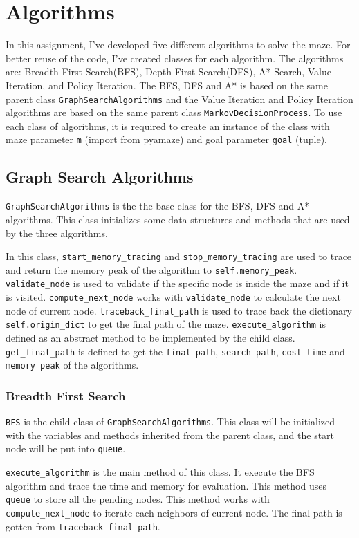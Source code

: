 \documentclass{article}
\begin{document}
\section{Algorithms}
In this assignment, I've developed five different algorithms to solve the maze. 
For better reuse of the code, I've created classes for each algorithm.
The algorithms are: Breadth First Search(BFS), Depth First Search(DFS), A* Search, Value Iteration, and Policy Iteration.
The BFS, DFS and A* is based on the same parent class \texttt{GraphSearchAlgorithms} and the Value Iteration and Policy Iteration algorithms are based on the same parent class \texttt{MarkovDecisionProcess}.
To use each class of algorithms, it is required to create an instance of the class with maze parameter \texttt{m} (import from pyamaze) and goal parameter \texttt{goal} (tuple). 
\subsection{Graph Search Algorithms}

\texttt{GraphSearchAlgorithms} is the the base class for the BFS, DFS and A* algorithms. This class initializes some data structures and methods that are used by the three algorithms. 

In this class, \texttt{start\_memory\_tracing} and \texttt{stop\_memory\_tracing} are used to trace and return the memory peak of the algorithm to \texttt{self.memory\_peak}. \texttt{validate\_node} is used to validate if the specific node is inside the maze and if it is visited.
\texttt{compute\_next\_node} works with \texttt{validate\_node} to calculate the next node of current node. \texttt{traceback\_final\_path} is used to trace back the dictionary \texttt{self.origin\_dict} to get the final path of the maze. \texttt{execute\_algorithm} is defined as an abstract method to be implemented by the child class. 
\texttt{get\_final\_path} is defined to get the \texttt{final path}, \texttt{search path}, \texttt{cost time} and \texttt{memory peak} of the algorithms. 

\subsubsection{Breadth First Search}
\texttt{BFS} is the child class of \texttt{GraphSearchAlgorithms}. 
This class will be initialized with the variables and methods inherited from the parent class, and the start node will be put into \texttt{queue}.

\texttt{execute\_algorithm} is the main method of this class. 
It execute the BFS algorithm and trace the time and memory for evaluation.
This method uses \texttt{queue} to store all the pending nodes.
This method works with \texttt{compute\_next\_node} to iterate each neighbors of current node. 
The final path is gotten from \texttt{traceback\_final\_path}.
\end{document}
